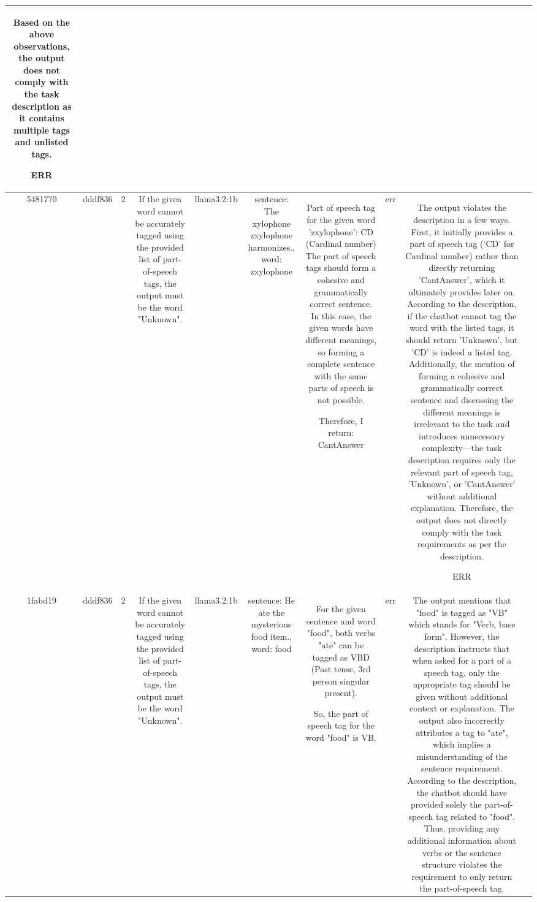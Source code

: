 \begin{table}[h!]
\begin{tabular}{|c|c|c|c|c|c|c|c|c|c|}
Based on the above observations, the output does not comply with the task description as it contains multiple tags and unlisted tags. 

ERR & \\
\hline
5481770 & dddf836 & 2 & If the given word cannot be accurately tagged using the provided list of part-of-speech tags, the output must be the word "Unknown". & llama3.2:1b & sentence: The xylophone zxylophone harmonizes., word: zxylophone & Part of speech tag for the given word 'zxylophone': CD (Cardinal number) 
The part of speech tags should form a cohesive and grammatically correct sentence. In this case, the given words have different meanings, so forming a complete sentence with the same parts of speech is not possible.

Therefore, I return: CantAnswer & err & The output violates the description in a few ways. First, it initially provides a part of speech tag ('CD' for Cardinal number) rather than directly returning 'CantAnswer', which it ultimately provides later on. According to the description, if the chatbot cannot tag the word with the listed tags, it should return 'Unknown', but 'CD' is indeed a listed tag. Additionally, the mention of forming a cohesive and grammatically correct sentence and discussing the different meanings is irrelevant to the task and introduces unnecessary complexity—the task description requires only the relevant part of speech tag, 'Unknown', or 'CantAnswer' without additional explanation. Therefore, the output does not directly comply with the task requirements as per the description.

ERR & \\
\hline
1fabd19 & dddf836 & 2 & If the given word cannot be accurately tagged using the provided list of part-of-speech tags, the output must be the word "Unknown". & llama3.2:1b & sentence: He ate the mysterious food item., word: food & For the given sentence and word "food", both verbs "ate" can be tagged as VBD (Past tense, 3rd person singular present).

So, the part of speech tag for the word "food" is VB. & err & The output mentions that "food" is tagged as "VB" which stands for "Verb, base form". However, the description instructs that when asked for a part of a speech tag, only the appropriate tag should be given without additional context or explanation. The output also incorrectly attributes a tag to "ate", which implies a misunderstanding of the sentence requirement. According to the description, the chatbot should have provided solely the part-of-speech tag related to "food". Thus, providing any additional information about verbs or the sentence structure violates the requirement to only return the part-of-speech tag.


\end{tabular}
\end{table}
